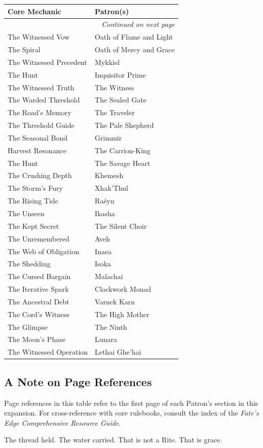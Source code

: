 \begin{longtable}{|p{5cm}|p{11cm}|}
\hline
\textbf{Core Mechanic} & \textbf{Patron(s)} \\
\hline
\endhead
\hline
\multicolumn{2}{|r|}{\textit{Continued on next page}} \\
\endfoot
\hline
\endlastfoot
The Witnessed Vow & Oath of Flame and Light \\
The Spiral & Oath of Mercy and Grace \\
The Witnessed Precedent & Mykkiel \\
The Hunt & Inquisitor Prime \\
The Witnessed Truth & The Witness \\
The Warded Threshold & The Sealed Gate \\
The Road's Memory & The Traveler \\
The Threshold Guide & The Pale Shepherd \\
The Seasonal Bond & Grimmir \\
Harvest Resonance & The Carrion-King \\
The Hunt & The Savage Heart \\
The Crushing Depth & Khemesh \\
The Storm's Fury & Xhak'Thul \\
The Rising Tide & Raéyn \\
The Unseen & Ikasha \\
The Kept Secret & The Silent Choir \\
The Unremembered & Aveh \\
The Web of Obligation & Inaea \\
The Shedding & Isoka \\
The Cursed Bargain & Malachai \\
The Iterative Spark & Clockwork Monad \\
The Ancestral Debt & Varnek Karn \\
The Cord's Witness & The High Mother \\
The Glimpse & The Ninth \\
The Moon's Phase & Lunara \\
The Witnessed Operation & Lethai Ghe'hai \\
\hline
\end{longtable}

\subsection*{A Note on Page References}

Page references in this table refer to the first page of each Patron's section in this expansion. For cross-reference with core rulebooks, consult the index of the \textit{Fate's Edge Comprehensive Resource Guide}.

The thread held. The water carried. That is not a Rite. That is grace.
